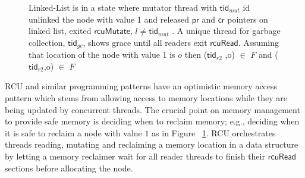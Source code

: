 \documentclass{article}
\begin{document}
\begin{figure}
\centering
{}

\caption{Linked-List is in a state where mutator thread with $\textsf{tid}_{mut}$ id unlinked the node with value 1 and released  $\textsf{pr}$ and $\textsf{cr}$ pointers on linked list, exited $\textsf{rcuMutate}$, $l \neq \textsf{tid}_{mut}$ . A unique thread for garbage collection, $\textsf{tid}_{gc}$, shows grace until all readers exit $\textsf{rcuRead}$.  Assuming that  location of the node with value 1 is $o$ then ($\textsf{tid}_{r2}$ ,o) $\in$ $F$ and ($\textsf{tid}_{r2}$,o) $\in$ $F$ }
\label{fig:unlinkedlist}
\end{figure}
RCU and similar programming patterns have an optimistic memory access pattern which stems from allowing access to memory locations while they are being updated by concurrent threads.  The crucial point on memory management to provide safe memory is deciding when to reclaim memory; e.g., deciding when it is safe to reclaim a node with value $1$ as in Figure ~\ref{fig:unlinkedlist}. RCU orchestrates threads reading, mutating and reclaiming a memory location in a data structure by letting a memory reclaimer wait for all reader threads to finish their $\textsf{rcuRead}$ sections before allocating the node.
\end{document}
